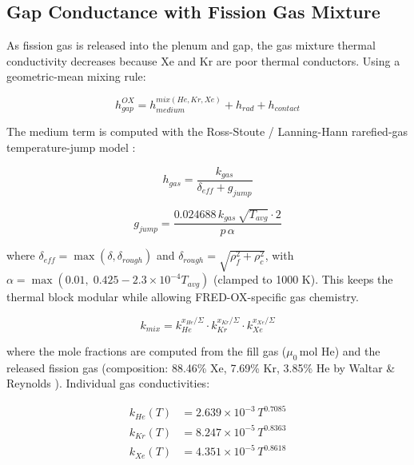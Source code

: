 \begin{refsection}
\subsection{Gap Conductance with Fission Gas Mixture}
\label{sec:gap_ox}

As fission gas is released into the plenum and gap, the gas mixture thermal conductivity decreases because Xe and Kr are poor thermal conductors.  Using a geometric-mean mixing rule:

\begin{equation}
  h_{gap}^{OX} = h_{medium}^{mix(He,Kr,Xe)} + h_{rad} + h_{contact}
  \label{eq:hgap_ox_modular}
\end{equation}

The medium term is computed with the Ross-Stoute / Lanning-Hann rarefied-gas temperature-jump model \cite{lanning1975}:

\begin{equation}
  h_{gas} = \frac{k_{gas}}{\delta_{eff} + g_{jump}}
  \label{eq:h_gas}
\end{equation}

\begin{equation}
  g_{jump} = \frac{0.024688\,k_{gas}\,\sqrt{T_{avg}}\cdot 2}{p\,\alpha}
  \label{eq:gjump}
\end{equation}

where $\delta_{eff} = \max(\delta, \delta_{rough})$ and $\delta_{rough}=\sqrt{\rho_f^2 + \rho_c^2}$, with $\alpha = \max(0.01,\;0.425 - 2.3\times10^{-4}T_{avg})$ (clamped to 1000 K). This keeps the thermal block modular while allowing FRED-OX-specific gas chemistry.

\begin{equation}
  k_{mix} = k_{He}^{x_{He}/\Sigma}
             \cdot k_{Kr}^{x_{Kr}/\Sigma}
             \cdot k_{Xe}^{x_{Xe}/\Sigma}
  \label{eq:kmix}
\end{equation}

where the mole fractions are computed from the fill gas ($\mu_0$\,mol He) and the released fission gas (composition: 88.46\% Xe, 7.69\% Kr, 3.85\% He by Waltar \& Reynolds \cite{waltar1981}).  Individual gas conductivities:

\begin{align}
  k_{He}(T) &= 2.639\times10^{-3}\,T^{0.7085} \label{eq:k_he2}\\
  k_{Kr}(T) &= 8.247\times10^{-5}\,T^{0.8363} \label{eq:k_kr}\\
  k_{Xe}(T) &= 4.351\times10^{-5}\,T^{0.8618} \label{eq:k_xe}
\end{align}


\end{refsection}
